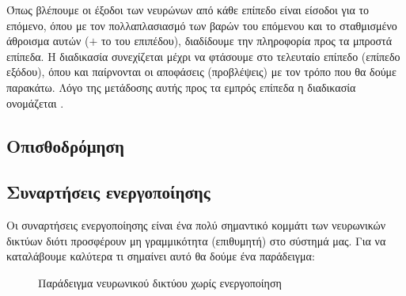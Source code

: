 Όπως βλέπουμε οι έξοδοι των νευρώνων από κάθε επίπεδο είναι είσοδοι για το επόμενο,
όπου με τον πολλαπλασιασμό των βαρών του επόμενου και το σταθμισμένο άθροισμα αυτών
($+$ το  του επιπέδου), διαδίδουμε την πληροφορία προς τα μπροστά επίπεδα. Η
διαδικασία συνεχίζεται μέχρι να φτάσουμε στο τελευταίο επίπεδο (επίπεδο εξόδου), όπου
και παίρνονται οι αποφάσεις (προβλέψεις) με τον τρόπο που θα δούμε παρακάτω. Λόγο της
μετάδοσης αυτής προς τα εμπρός επίπεδα η διαδικασία ονομάζεται .
\subsection{Οπισθοδρόμηση}

\subsection{Συναρτήσεις ενεργοποίησης}
Οι συναρτήσεις ενεργοποίησης είναι ένα πολύ σημαντικό κομμάτι των νευρωνικών δικτύων διότι προσφέρουν μη γραμμικότητα (επιθυμητή) στο σύστημά μας. Για να καταλάβουμε καλύτερα τι σημαίνει αυτό θα δούμε ένα παράδειγμα\cite{nnactmlm}:
\begin{figure}[H]
    \centering
    \caption{Παράδειγμα νευρωνικού δικτύου χωρίς ενεργοποίηση}
\end{figure}

